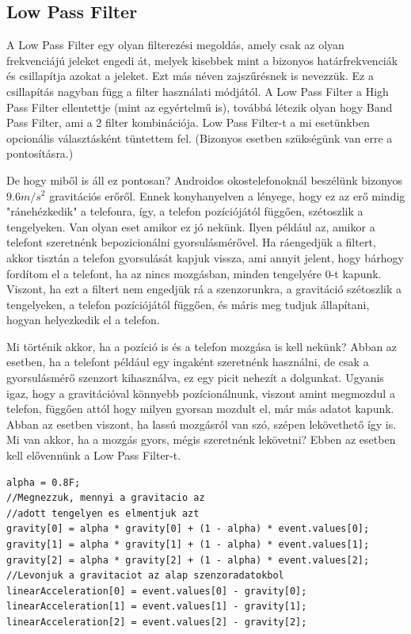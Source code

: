 \documentclass{thesis-ekf}
\theoremstyle{definition}
\theoremstyle{remark}
\begin{document}
\subsection{Low Pass Filter}
A Low Pass Filter egy olyan filterezési megoldás, amely csak az olyan frekvenciájú jeleket engedi át, melyek kisebbek mint a bizonyos határfrekvenciák és csillapítja azokat a jeleket. Ezt más néven zajszűrésnek is nevezzük. Ez a csillapítás nagyban függ a filter használati módjától. A Low Pass Filter a High Pass Filter ellentettje (mint az egyértelmű is), továbbá létezik olyan hogy Band Pass Filter, ami a 2 filter kombinációja. Low Pass Filter-t a mi esetünkben opcionális választásként tüntettem fel. (Bizonyos esetben szükségünk van erre a pontosításra.)
\par De hogy miből is áll ez pontosan? Androidos okostelefonoknál beszélünk bizonyos $9.6 m/s^2$ gravitációs erőről. Ennek konyhanyelven a lényege, hogy ez az erő mindig "ránehézkedik" a telefonra, így, a telefon pozíciójától függően, szétoszlik a tengelyeken. Van olyan eset amikor ez jó nekünk. Ilyen például az, amikor a telefont szeretnénk bepozicionálni gyorsulásmérővel. Ha ráengedjük a filtert, akkor tisztán a telefon gyorsulását kapjuk vissza, ami annyit jelent, hogy bárhogy fordítom el a telefont, ha az nincs mozgásban, minden tengelyére 0-t kapunk. Viszont, ha ezt a filtert nem engedjük rá a szenzorunkra, a gravitáció szétoszlik a tengelyeken, a telefon pozíciójától függően, és máris meg tudjuk állapítani, hogyan helyezkedik el a telefon.
\par Mi történik akkor, ha a pozíció is és a telefon mozgása is kell nekünk? Abban az esetben, ha a telefont például egy ingaként szeretnénk használni, de csak a gyorsulásmérő szenzort kihasználva, ez egy picit nehezít a dolgunkat. Ugyanis igaz, hogy a gravitációval könnyebb pozícionálnunk, viszont amint megmozdul a telefon, függően attól hogy milyen gyorsan mozdult el, már más adatot kapunk. Abban az esetben viszont, ha lassú mozgásról van szó, szépen lekövethető így is. Mi van akkor, ha a mozgás gyors, mégis szeretnénk lekövetni? Ebben az esetben kell elővennünk a Low Pass Filter-t.
\begin{lstlisting}
alpha = 0.8F;
//Megnezzuk, mennyi a gravitacio az
//adott tengelyen es elmentjuk azt
gravity[0] = alpha * gravity[0] + (1 - alpha) * event.values[0];
gravity[1] = alpha * gravity[1] + (1 - alpha) * event.values[1];
gravity[2] = alpha * gravity[2] + (1 - alpha) * event.values[2];
//Levonjuk a gravitaciot az alap szenzoradatokbol
linearAcceleration[0] = event.values[0] - gravity[0];
linearAcceleration[1] = event.values[1] - gravity[1];
linearAcceleration[2] = event.values[2] - gravity[2];
\end{lstlisting}
\end{document}
